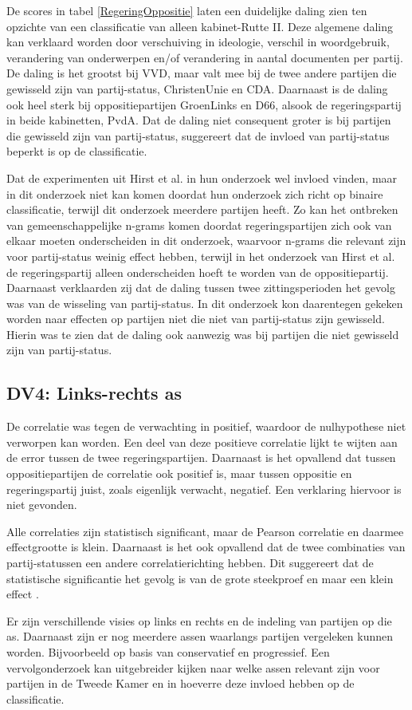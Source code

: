 De scores in tabel \ref{RegeringOppositie} laten een duidelijke daling zien ten opzichte van een classificatie van alleen kabinet-Rutte II. Deze algemene daling kan verklaard worden door verschuiving in ideologie, verschil in woordgebruik, verandering van onderwerpen en/of verandering in aantal documenten per partij. De daling is het grootst bij VVD, maar valt mee bij de twee andere partijen die gewisseld zijn van partij-status, ChristenUnie en CDA. Daarnaast is de daling ook heel sterk bij oppositiepartijen GroenLinks en D66, alsook de regeringspartij in beide kabinetten, PvdA. Dat de daling niet consequent groter is bij partijen die gewisseld zijn van partij-status, suggereert dat de invloed van partij-status beperkt is op de classificatie.\par
Dat de experimenten uit Hirst et al. in hun onderzoek wel invloed vinden, maar in dit onderzoek niet kan komen doordat hun onderzoek zich richt op binaire classificatie, terwijl dit onderzoek meerdere partijen heeft. Zo kan het ontbreken van gemeenschappelijke n-grams komen doordat regeringspartijen zich ook van elkaar moeten onderscheiden in dit onderzoek, waarvoor n-grams die relevant zijn voor partij-status weinig effect hebben, terwijl in het onderzoek van Hirst et al. de regeringspartij alleen onderscheiden hoeft te worden van de oppositiepartij. Daarnaast verklaarden zij dat de daling tussen twee zittingsperioden het gevolg was van de wisseling van partij-status. In dit onderzoek kon daarentegen gekeken worden naar effecten op partijen niet die niet van partij-status zijn gewisseld. Hierin was te zien dat de daling ook aanwezig was bij partijen die niet gewisseld zijn van partij-status.\par

\subsection{DV4: Links-rechts as}
De correlatie was tegen de verwachting in positief, waardoor de nulhypothese niet verworpen kan worden. Een deel van deze positieve correlatie lijkt te wijten aan de error tussen de twee regeringspartijen. Daarnaast is het opvallend dat tussen oppositiepartijen de correlatie ook positief is, maar tussen oppositie en regeringspartij juist, zoals eigenlijk verwacht, negatief. Een verklaring hiervoor is niet gevonden. \par
Alle correlaties zijn statistisch significant, maar de Pearson correlatie en daarmee effectgrootte is klein. Daarnaast is het ook opvallend dat de twee combinaties van partij-statussen een andere correlatierichting hebben. Dit suggereert dat de statistische significantie het gevolg is van de grote steekproef en maar een klein effect \cite{Hair}.\par
Er zijn verschillende visies op links en rechts en de indeling van partijen op die as. Daarnaast zijn er nog meerdere assen waarlangs partijen vergeleken kunnen worden. Bijvoorbeeld op basis van conservatief en progressief. Een vervolgonderzoek kan uitgebreider kijken naar welke assen relevant zijn voor partijen in de Tweede Kamer en in hoeverre deze invloed hebben op de classificatie. \par

